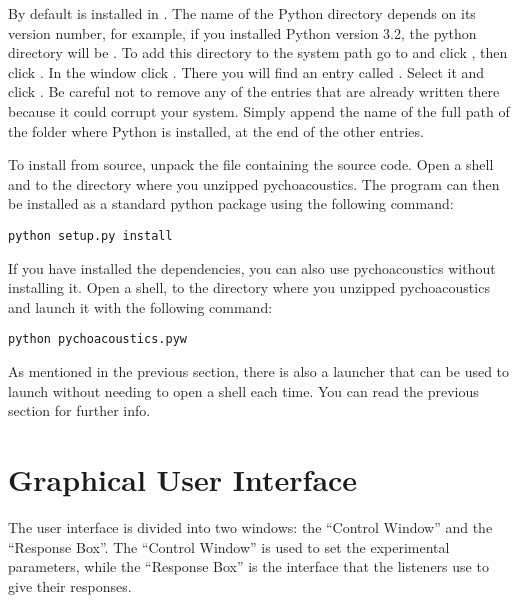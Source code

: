 \documentclass[a4paper,12pt,english]{sphinxmanual}
\begin{document}
By default  is installed in . The name of the Python
directory depends on its version number, for example, if you installed
Python version 3.2, the python directory will be . To add
this directory to the system path go to  and click
, then click . In the
 window click . There you
will find an entry called . Select it and click . Be
careful not to remove any of the entries that are already written there
because it could corrupt your system. Simply append the name of the full
path of the folder where Python is installed, at the end of the
other entries.

To install  from source, unpack the 
 file containing the source code. Open a  shell and
 to the directory where you unzipped pychoacoustics. The program
can then be installed as a standard python package using the following
command:

\begin{Verbatim}[commandchars=\\\{\}]
python setup.py install
\end{Verbatim}

If you have installed the dependencies, you can also use pychoacoustics
without installing it. Open a  shell,  to the directory
where you unzipped pychoacoustics and launch it with the following
command:

\begin{Verbatim}[commandchars=\\\{\}]
python pychoacoustics.pyw
\end{Verbatim}

As mentioned in the previous section, there is also a  launcher
that can be used to launch  without needing to open a
 shell each time. You can read the previous section for further
info.


\chapter{Graphical User Interface}
\label{graphical_user_interface:sec-graphical-user-interface}\label{graphical_user_interface::doc}\label{graphical_user_interface:graphical-user-interface}
The user interface is divided into two windows: the “Control Window” and
the “Response Box”. The “Control Window” is used to set the experimental
parameters, while the “Response Box” is the interface that the listeners
use to give their responses.
\end{document}
